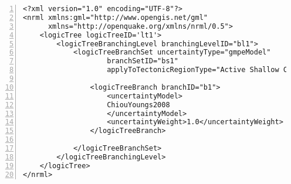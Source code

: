 \begin{Verbatim}[frame=single, commandchars=\\\{\}, fontsize=\small,
    firstnumber=1, numbers=left, numbersep=2pt]
<?xml version="1.0" encoding="UTF-8"?>
<nrml xmlns:gml="http://www.opengis.net/gml"
      xmlns="http://openquake.org/xmlns/nrml/0.5">
    <logicTree logicTreeID='lt1'>
        <logicTreeBranchingLevel branchingLevelID="bl1">
            <logicTreeBranchSet uncertaintyType="gmpeModel"
                    branchSetID="bs1"
                    applyToTectonicRegionType="Active Shallow Crust">

                <logicTreeBranch branchID="b1">
                    <uncertaintyModel>
                    ChiouYoungs2008
                    </uncertaintyModel>
                    <uncertaintyWeight>1.0</uncertaintyWeight>
                </logicTreeBranch>

            </logicTreeBranchSet>
        </logicTreeBranchingLevel>
    </logicTree>
</nrml>
\end{Verbatim}